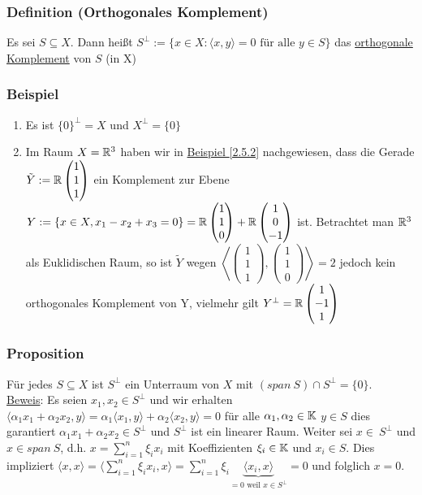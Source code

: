 \subsubsection{Definition (Orthogonales Komplement)}
Es sei $S \subseteq X$. Dann heißt $S^\bot:=\{x\in X:\langle x,y \rangle =0\text{ für alle }y\in S\}$
 das \underline{orthogonale Komplement} von $S$ (in X)
\subsubsection{Beispiel}
\numbers
\begin{enumerate}
\item Es ist $\{0\}^\bot=X$ und $X^{\bot}=\{0\}$
\item Im Raum $X=\mathbb{R}^3$ haben wir in \hyperref[2.5.2]{Beispiel \ref*{2.5.2}} nachgewiesen, dass die Gerade $\tilde{Y}:=\mathbb{R}\begin{pmatrix}1 \\1 \\1\end{pmatrix}$ ein Komplement zur Ebene $Y:=\{x\in X, x_1-x_2+x_3=0\}=\mathbb{R}\begin{pmatrix}1\\1\\0\end{pmatrix}+\mathbb{R}\begin{pmatrix}1\\0\\-1\end{pmatrix}$ ist.
Betrachtet man $\mathbb{R}^3$ als Euklidischen Raum, so ist $\tilde{Y}$ wegen $\left\langle \begin{pmatrix}1 \\1 \\1\end{pmatrix},\begin{pmatrix}1 \\1 \\0\end{pmatrix}\right\rangle=2$ jedoch kein orthogonales Komplement von Y, vielmehr gilt $Y^{\bot}=\mathbb{R}\begin{pmatrix}1 \\-1 \\1\end{pmatrix}$
\end{enumerate}
\subsubsection{Proposition}
\label{5.1.9}
Für jedes $S\subseteq X$ ist $S^{\bot}$ ein Unterraum von $X$ mit $(span\ S)\cap S^{\bot}=\{0\}$.\\
\underline{Beweis}: Es seien $x_1,x_2\in S^{\bot}$ und wir erhalten $\langle \alpha_1 x_1+\alpha_2 x_2,y\rangle=\alpha_1\langle x_1,y\rangle+\alpha_2\langle x_2,y\rangle=0$ für alle $\alpha_1,\alpha_2\in\mathbb{K}$ $y\in S$ dies garantiert $\alpha_1 x_1+\alpha_2 x_2\in S^{\bot}$ und $S^{\bot}$ ist ein linearer Raum.
Weiter sei $x\in\ S^{\bot}$ und $x\in span~S$, d.h. $x=\sum_{i=1}^n \xi_i x_i$ mit Koeffizienten $\xi_i\in \mathbb{K}$ und $x_i\in S$. Dies impliziert $\langle x,x\rangle=\langle \sum_{i=1}^n \xi_i x_i,x\rangle=\sum_{i=1}^n\xi_i \underbrace{\langle x_i,x\rangle}_{=0\text{ weil }x\in S^{\bot}}=0$ und folglich $x=0$.

